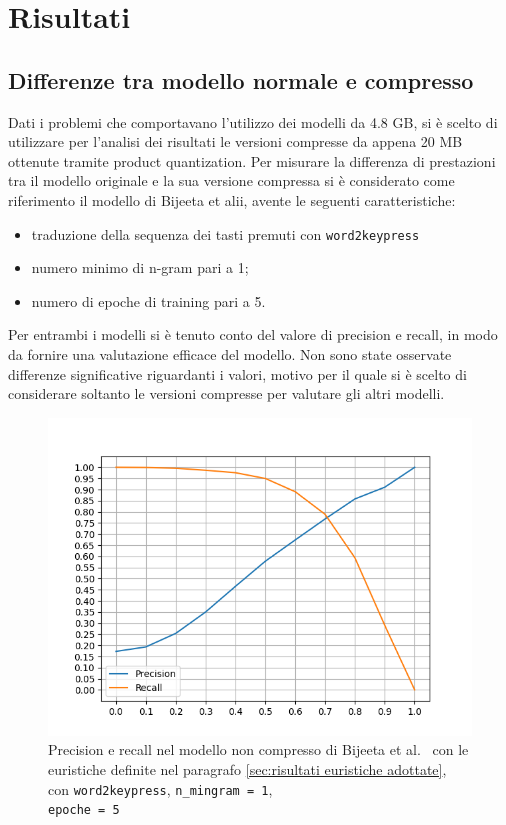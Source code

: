 \chapter{Risultati}
\label{ch:risultati}
\section{Differenze tra modello normale e compresso}
\label{sec:differenze modello normale e compresso}
Dati i problemi che comportavano l'utilizzo dei modelli da 4.8 GB, si è scelto di utilizzare per l'analisi dei risultati le versioni compresse da appena 20 MB ottenute tramite product quantization.
Per misurare la differenza di prestazioni tra il modello originale e la sua versione compressa si è considerato come riferimento il modello di Bijeeta et alii, avente le seguenti caratteristiche:
\begin{itemize}
    \item traduzione della sequenza dei tasti premuti con \texttt{word2keypress}
    \item numero minimo di n-gram pari a 1;
    \item numero di epoche di training pari a 5.
\end{itemize}
Per entrambi i modelli si è tenuto conto del valore di precision e recall, in modo da fornire una valutazione efficace del modello.
Non sono state osservate differenze significative riguardanti i valori, motivo per il quale si è scelto di considerare soltanto le versioni compresse per valutare gli altri modelli.

\begin{figure}[H]
    \centering
    \includegraphics[width=11.5cm]{./immagini/big_model.png}
    \caption{Precision e recall nel modello non compresso di Bijeeta et al.~\cite{bijeeta} con le euristiche definite nel paragrafo \ref{sec:risultati euristiche adottate}, con \texttt{word2keypress}, \texttt{n\_mingram = 1},\\\texttt{epoche = 5}}
    \label{bigmodel}
\end{figure}

